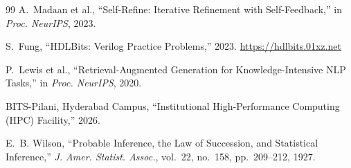 \documentclass[11pt]{article}
\begin{document}
\begin{thebibliography}{99}
A.~Madaan et al., ``Self-Refine: Iterative Refinement with Self-Feedback,'' in
\emph{Proc. NeurIPS}, 2023.

S.~Fung, ``HDLBits: Verilog Practice Problems,'' 2023.
\url{https://hdlbits.01xz.net}

P.~Lewis et al., ``Retrieval-Augmented Generation for Knowledge-Intensive NLP
Tasks,'' in \emph{Proc. NeurIPS}, 2020.

BITS-Pilani, Hyderabad Campus, ``Institutional High-Performance Computing (HPC)
Facility,'' 2026.

E.~B. Wilson, ``Probable Inference, the Law of Succession, and Statistical
Inference,'' \emph{J. Amer. Statist. Assoc.}, vol.~22, no.~158, pp.~209--212,
1927.

\end{thebibliography}
\end{document}
